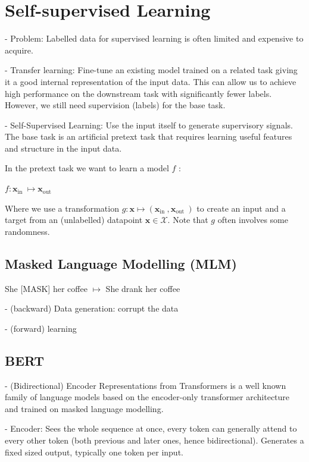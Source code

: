 
\section*{Self-supervised Learning}
- Problem: Labelled data for supervised learning is often limited and expensive to acquire.

- Transfer learning: Fine-tune an existing model trained on a related task giving it a good internal representation of the input data. This can allow us to achieve high performance on the downstream task with significantly fewer labels. However, we still need supervision (labels) for the base task.

- Self-Supervised Learning: Use the input itself to generate supervisory signals. The base task is an artificial pretext task that requires learning useful features and structure in the input data.

In the pretext task we want to learn a model $f$ :

$
f: \mathbf{x}_{\text {in }} \mapsto \mathbf{x}_{\text {out }}
$

Where we use a transformation $g: \mathbf{x} \mapsto\left(\mathbf{x}_{\text {in }}, \mathbf{x}_{\text {out }}\right)$ to create an input and a target from an (unlabelled) datapoint $\mathbf{x} \in \mathcal{X}$. Note that $g$ often involves some randomness.


\subsection*{Masked Language Modelling (MLM)}

She [MASK] her coffee $\mapsto$ She drank her coffee

- (backward) Data generation: corrupt the data

- (forward) learning

\subsection*{BERT}
- (Bidirectional) Encoder Representations from Transformers is a well known family of language models based on the encoder-only transformer architecture and trained on masked language modelling.

- Encoder: Sees the whole sequence at once, every token can generally attend to every other token (both previous and later ones, hence bidirectional). Generates a fixed sized output, typically one token per input.



